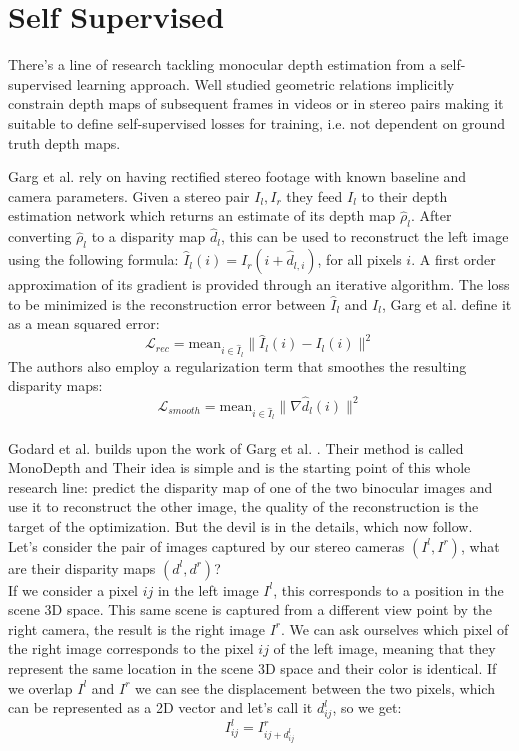 
\section{Self Supervised}
There's a line of research tackling monocular depth estimation from a self-supervised learning approach. Well studied geometric relations implicitly constrain depth maps of subsequent frames in videos or in stereo pairs making it suitable to define self-supervised losses for training, i.e. not dependent on ground truth depth maps.\\


Garg et al. \cite{Garg} rely on having rectified stereo footage with known baseline and camera parameters. Given a stereo pair $I_{l}, I_{r}$ they feed $I_{l}$ to their depth estimation network which returns an estimate of its depth map $\hat{\rho}_{l}$. After converting $\hat{\rho}_{l}$ to a disparity map $\hat{d}_{l}$, this can be used to reconstruct the left image using the following formula: $\hat{I}_{l} (i) = I_{r} (i + \hat{d}_{l, i})$, for all pixels $i$. A first order approximation of its gradient is provided through an iterative algorithm. The loss to be minimized is the reconstruction error between $\hat{I}_{l}$ and $I_{l}$, Garg et al. define it as a mean squared error:
\[
	\mathcal{L}_{rec} = \text{mean}_{i \in \hat{I}_{l}} \big\| \hat{I}_{l}(i) - I_{l}(i) \big\|^{2}
\]
The authors also employ a regularization term that smoothes the resulting disparity maps:
\[
	\mathcal{L}_{smooth} = \text{mean}_{i \in \hat{I}_{l}} \big\| \nabla \hat{d}_{l} (i) \big\|^{2}
\]
\\


Godard et al. \cite{MonoDepth} builds upon the work of Garg et al. \cite{Garg}. Their method is called MonoDepth and  Their idea is simple and is the starting point of this whole research line: predict the disparity map of one of the two binocular images and use it to reconstruct the other image, the quality of the reconstruction is the target of the optimization. But the devil is in the details, which now follow.\\

Let's consider the pair of images captured by our stereo cameras $(I^{l}, I^{r})$, what are their disparity maps $(d^{l}, d^{r})$?\\
If we consider a pixel $ij$ in the left image $I^{l}$, this corresponds to a position in the scene 3D space. This same scene is captured from a different view point by the right camera, the result is the right image $I^{r}$. We can ask ourselves which pixel of the right image corresponds to the pixel $ij$ of the left image, meaning that they represent the same location in the scene 3D space and their color is identical. If we overlap $I^{l}$ and $I^{r}$ we can see the displacement between the two pixels, which can be represented as a 2D vector and let's call it $d^{l}_{ij}$, so we get:
\[
	I^{l}_{ij} = I^{r}_{ij + d^{l}_{ij}}
\]

